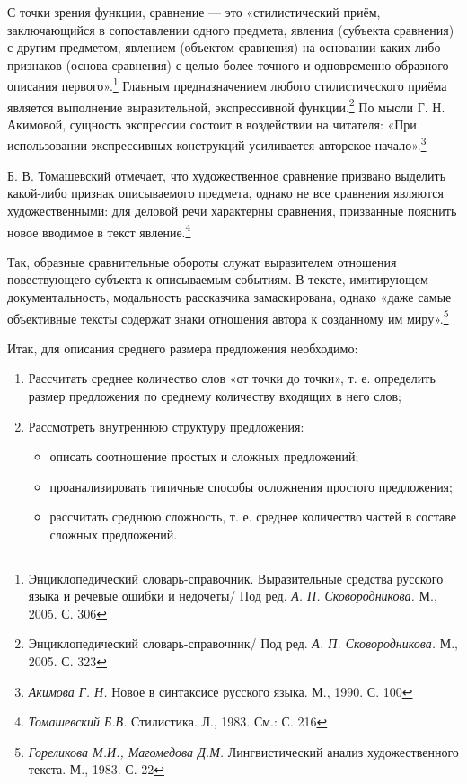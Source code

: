 \documentclass{kursa4}
\begin{document}
{      С точки зрения функции, сравнение — это «стилистический приём, заключающийся в сопоставлении одного предмета, явления (субъекта сравнения) с другим предметом, явлением (объектом сравнения) на основании каких-либо признаков (основа сравнения) с целью более точного и одновременно образного описания первого».\footnote{Энциклопедический словарь-справочник. Выразительные средства русского языка и речевые ошибки и недочеты/ Под ред. \textit{А. П. Сковородникова.} М., 2005. С. 306} Главным предназначением любого стилистического приёма является выполнение выразительной, экспрессивной функции.\footnote{Энциклопедический словарь-справочник/ Под ред. \textit{А. П. Сковородникова.} М., 2005. С. 323} По мысли Г. Н. Акимовой, сущность экспрессии  состоит в воздействии на читателя: «При использовании экспрессивных конструкций усиливается авторское начало».\footnote{\textit{Акимова Г. Н.} Новое в синтаксисе русского языка. М., 1990. С. 100} 

      Б. В. Томашевский отмечает, что художественное сравнение призвано выделить какой-либо признак описываемого предмета, однако не все сравнения являются художественными: для деловой речи характерны сравнения, призванные  пояснить новое вводимое в текст явление.\footnote{\textit{Томашевский Б.В.} Стилистика. Л., 1983. См.: С. 216} 

      Так, образные сравнительные обороты служат выразителем отношения повествующего субъекта к описываемым событиям. В тексте, имитирующем документальность, модальность рассказчика замаскирована, однако «даже самые объективные тексты содержат знаки отношения автора к созданному им миру».\footnote{\textit{Гореликова М.И., Магомедова Д.М.} Лингвистический анализ художественного текста. М., 1983. С. 22}  

      Итак, для описания среднего размера предложения необходимо: 
      \begin{enumerate}
        \item Рассчитать среднее количество слов «от точки до точки», т. е. определить размер предложения по среднему количеству входящих в него слов; \item Рассмотреть внутреннюю структуру предложения: 
        \begin{itemize}
          \item описать соотношение простых и сложных предложений; \item проанализировать типичные способы осложнения простого предложения; \item рассчитать среднюю сложность, т. е. среднее количество частей в составе сложных предложений. \end{itemize}
      \end{enumerate}

}
\end{document}
